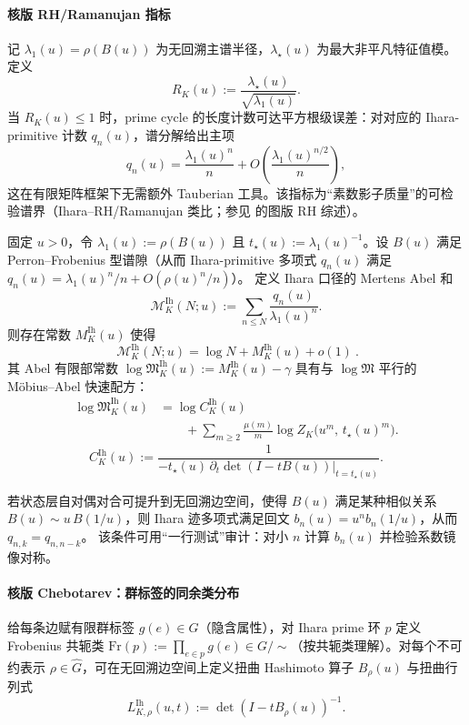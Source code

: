 \paragraph{核版 RH/Ramanujan 指标}
记 $\lambda_1(u)=\rho(B(u))$ 为无回溯主谱半径，$\lambda_\star(u)$ 为最大非平凡特征值模。定义
\[
R_K(u):=\frac{\lambda_\star(u)}{\sqrt{\lambda_1(u)}}.
\]
当 $R_K(u)\le 1$ 时，prime cycle 的长度计数可达平方根级误差：对对应的 Ihara-primitive 计数 $q_n(u)$，谱分解给出主项
\[
q_n(u)=\frac{\lambda_1(u)^n}{n}+O\!\left(\frac{\lambda_1(u)^{n/2}}{n}\right),
\]
这在有限矩阵框架下无需额外 Tauberian 工具。该指标为“素数影子质量”的可检验谱界（Ihara--RH/Ramanujan 类比；参见 \cite{TerrasZetaGraphs,StarkTerras1996GraphCoverings} 的图版 RH 综述）。

\begin{proposition}\label{prop:ihara-mertens-constant}
固定 \(u>0\)，令 \(\lambda_1(u):=\rho(B(u))\) 且 \(t_\star(u):=\lambda_1(u)^{-1}\)。设 \(B(u)\) 满足 Perron--Frobenius 型谱隙（从而 Ihara-primitive 多项式 \(q_n(u)\) 满足 \(q_n(u)=\lambda_1(u)^n/n+O(\rho(u)^n/n)\)）。
定义 Ihara 口径的 Mertens Abel 和
\[
\mathcal{M}^{\mathrm{Ih}}_K(N;u):=\sum_{n\le N}\frac{q_n(u)}{\lambda_1(u)^n}.
\]
则存在常数 \(M^{\mathrm{Ih}}_K(u)\) 使得
\[
\boxed{\ \mathcal{M}^{\mathrm{Ih}}_K(N;u)=\log N+M^{\mathrm{Ih}}_K(u)+o(1)\ }.
\]
其 Abel 有限部常数 \(\log\mathfrak{M}^{\mathrm{Ih}}_K(u):=M^{\mathrm{Ih}}_K(u)-\gamma\) 具有与 \(\log\mathfrak{M}\) 平行的 Möbius--Abel 快速配方：
\[
\boxed{
\begin{aligned}
\log\mathfrak{M}^{\mathrm{Ih}}_K(u)
&=\log C^{\mathrm{Ih}}_K(u)\\
&\qquad +\sum_{m\ge 2}\frac{\mu(m)}{m}\log Z_K\!\bigl(u^m,\,t_\star(u)^m\bigr).
\end{aligned}
}
\]
\[
C^{\mathrm{Ih}}_K(u):=\frac{1}{-t_\star(u)\,\partial_t\det(I-tB(u))\big|_{t=t_\star(u)}}.
\]
\end{proposition}

\begin{conjecture}\label{conj:ihara-duality-lift}
若状态层自对偶对合可提升到无回溯边空间，使得 \(B(u)\) 满足某种相似关系 \(B(u)\sim u\,B(1/u)\)，则 Ihara 迹多项式满足回文
\(
b_n(u)=u^n b_n(1/u)
\)，从而 \(q_{n,k}=q_{n,n-k}\)。
该条件可用“一行测试”审计：对小 \(n\) 计算 \(b_n(u)\) 并检验系数镜像对称。
\end{conjecture}

\paragraph{核版 Chebotarev：群标签的同余类分布}
给每条边赋有限群标签 \(g(e)\in G\)（隐含属性），对 Ihara prime 环 \(p\) 定义 Frobenius 共轭类
\(
\mathrm{Fr}(p):=\prod_{e\in p}g(e)\in G/\!\sim
\)（按共轭类理解）。对每个不可约表示 \(\rho\in\widehat G\)，可在无回溯边空间上定义扭曲 Hashimoto 算子 \(B_{\rho}(u)\) 与扭曲行列式
\[
L^{\mathrm{Ih}}_{K,\rho}(u,t):=\det(I-tB_\rho(u))^{-1}.
\]

